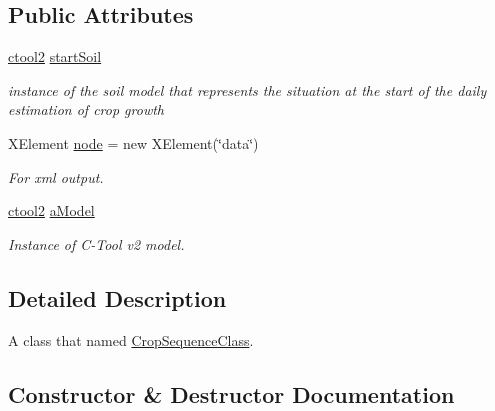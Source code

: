 \subsection*{Public Attributes}
\begin{DoxyCompactItemize}
\item 
\mbox{\hyperlink{classctool2}{ctool2}} \mbox{\hyperlink{class_crop_sequence_class_ab6529f542f15e934ba631c83e17224f1}{start\+Soil}}
\begin{DoxyCompactList}\small\item\em instance of the soil model that represents the situation at the start of the daily estimation of crop growth \end{DoxyCompactList}\item 
X\+Element \mbox{\hyperlink{class_crop_sequence_class_aeb621b262d3b943df74d6d2fc5835868}{node}} = new X\+Element(\char`\"{}data\char`\"{})
\begin{DoxyCompactList}\small\item\em For xml output. \end{DoxyCompactList}\item 
\mbox{\hyperlink{classctool2}{ctool2}} \mbox{\hyperlink{class_crop_sequence_class_a46255236553411f929a97ecc1d68fb53}{a\+Model}}
\begin{DoxyCompactList}\small\item\em Instance of C-\/\+Tool v2 model. \end{DoxyCompactList}\end{DoxyCompactItemize}


\subsection{Detailed Description}
A class that named \mbox{\hyperlink{class_crop_sequence_class}{Crop\+Sequence\+Class}}. 

\subsection{Constructor \& Destructor Documentation}
\mbox{\label{class_crop_sequence_class_a0013767aa3275e61eed72c93a8fe8c88}} 

